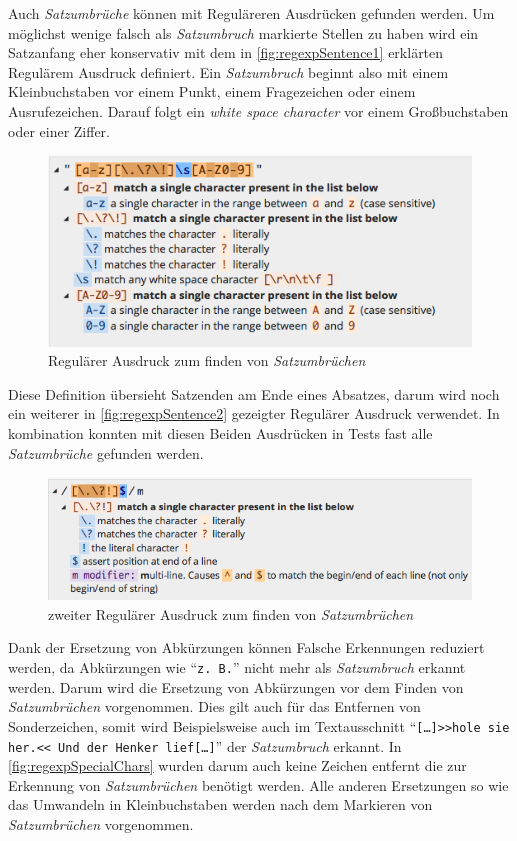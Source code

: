         Auch \emph{Satzumbrüche} können mit Reguläreren Ausdrücken gefunden werden. Um möglichst wenige falsch als \emph{Satzumbruch} markierte Stellen zu haben wird ein Satzanfang eher konservativ mit dem in \autoref{fig:regexpSentence1} erklärten Regulärem Ausdruck definiert. Ein \emph{Satzumbruch} beginnt also mit einem Kleinbuchstaben vor einem Punkt, einem Fragezeichen oder einem Ausrufezeichen. Darauf folgt ein \emph{white space character} vor einem Großbuchstaben oder einer Ziffer.
            
		\begin{figure}[H]
        	\centering
            \includegraphics[width=0.8\linewidth]{images/regexpSentence.png}
  			\caption{Regulärer Ausdruck zum finden von \emph{Satzumbrüchen} \parencite{regex101:sentence1}}
			\label{fig:regexpSentence1}
		\end{figure}
            
		Diese Definition übersieht Satzenden am Ende eines Absatzes, darum wird noch ein weiterer in \autoref{fig:regexpSentence2} gezeigter Regulärer Ausdruck verwendet. In kombination konnten mit diesen Beiden Ausdrücken in Tests fast alle \emph{Satzumbrüche} gefunden werden.
            
        \begin{figure}[H]
			\centering
            \includegraphics[width=0.8\linewidth]{images/regexpSentence2.png}
  			\caption{zweiter Regulärer Ausdruck zum finden von \emph{Satzumbrüchen} \parencite{regex101:sentence2}}
			\label{fig:regexpSentence2}
		\end{figure}
            
        Dank der Ersetzung von Abkürzungen können Falsche Erkennungen reduziert werden, da Abkürzungen wie \enquote{\texttt{z. B.}} nicht mehr als \emph{Satzumbruch} erkannt werden. Darum wird die Ersetzung von Abkürzungen vor dem Finden von \emph{Satzumbrüchen} vorgenommen. Dies gilt auch für das Entfernen von Sonderzeichen, somit wird Beispielsweise auch im Textausschnitt \enquote{\texttt{[\dots]>>hole sie her.<< Und der Henker lief[\dots]}} der \emph{Satzumbruch} erkannt. In \autoref{fig:regexpSpecialChars} wurden darum auch keine Zeichen entfernt die zur Erkennung von \emph{Satzumbrüchen} benötigt werden. Alle anderen Ersetzungen so wie das Umwandeln in Kleinbuchstaben werden nach dem Markieren von \emph{Satzumbrüchen} vorgenommen.

